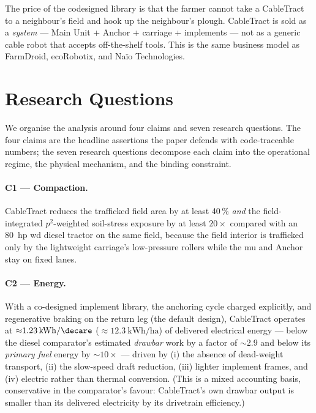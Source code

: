 \documentclass[11pt,a4paper]{article}
\begin{document}
The price of the codesigned library is that the farmer cannot take a CableTract to a neighbour's field and hook up the neighbour's plough. CableTract is sold as a \emph{system} --- Main Unit + Anchor + carriage + implements --- not as a generic cable robot that accepts off-the-shelf tools. This is the same business model as FarmDroid, ecoRobotix, and Na\"io Technologies.

\section{Research Questions}\label{sec:rqs}

We organise the analysis around four claims and seven research questions. The four claims are the headline assertions the paper defends with code-traceable numbers; the seven research questions decompose each claim into the operational regime, the physical mechanism, and the binding constraint.

\paragraph{C1 --- Compaction.} CableTract reduces the trafficked field area by at least 40\,\% \emph{and} the field-integrated $p^2$-weighted soil-stress exposure by at least $20\times$ compared with an \SI{80}{hp} \gls{wd} diesel tractor on the same field, because the field interior is trafficked only by the lightweight carriage's low-pressure rollers while the \gls{mu} and Anchor stay on fixed lanes.

\paragraph{C2 --- Energy.} With a co-designed implement library, the anchoring cycle charged explicitly, and regenerative braking on the return leg (the default design), CableTract operates at ${\approx}\SI{1.23}{\kWh\per\decare}$ (${\approx}\SI{12.3}{\kWh\per\hectare}$) of delivered electrical energy --- below the diesel comparator's estimated \emph{drawbar} work by a factor of ${\sim}2.9$ and below its \emph{primary fuel} energy by ${\sim}10\times$ --- driven by (i) the absence of dead-weight transport, (ii) the slow-speed draft reduction, (iii) lighter implement frames, and (iv) electric rather than thermal conversion. (This is a mixed accounting basis, conservative in the comparator's favour: CableTract's own drawbar output is smaller than its delivered electricity by its drivetrain efficiency.)
\end{document}

